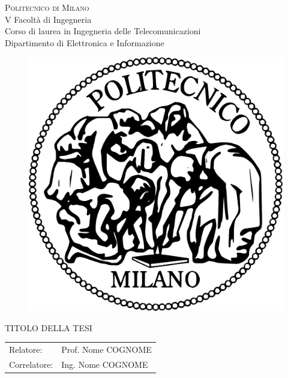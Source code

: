 



\thispagestyle{empty}
\enlargethispage{60mm}
\begin{center}
\Large{\textsc{Politecnico di Milano}}\\
\large{V Facolt\`a di Ingegneria}\\
\large{Corso di laurea in Ingegneria delle Telecomunicazioni}\\
\large{Dipartimento di Elettronica e Informazione}\\
\vspace{7mm}
\begin{figure}[h]
\begin{center}
\includegraphics[scale=0.15]{gfx/logo}
\end{center}
\end{figure}
\vspace{2mm}

\begin{LARGE}
TITOLO DELLA TESI
\end{LARGE}
\vspace{25mm}

\begin{flushleft}
\begin{tabular}{l l }
Relatore:    & Prof. Nome COGNOME\\
Correlatore: & Ing. Nome COGNOME\\
\end{tabular}
\end{flushleft}
\vspace{25mm}


\end{center}
